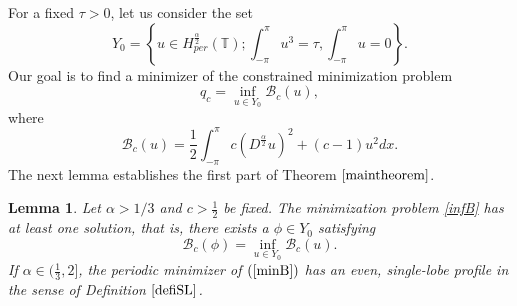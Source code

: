 \documentclass[12pt,reqno]{amsart}
\newcommand{\2}{L^2_{per}(0, T)}
\numberwithin{equation}{section}
\numberwithin{figure}{section}
\newtheorem{lemma}[theorem]{Lemma}
\begin{document}
For a fixed $\tau>0$, let us consider the set
\begin{equation}\displaystyle	Y_{0} = \left\{ u \in  H^{\frac{\alpha}{2}}_{per}(\mathbb{T}); \int_{-\pi}^{\pi}u^3 =\tau,  \int_{-\pi}^{\pi} u =0 \right\}.\label{Ycond} \end{equation}
Our goal is to find a minimizer of the constrained minimization problem
\begin{equation}\label{infB}
\displaystyle q_c= \inf_{u \in Y_{0}} \mathcal{B}_c(u),
\end{equation}
where
\begin{equation}\label{Bfunctional}
\displaystyle \mathcal{B}_c(u) = \frac{1}{2}\int_{-\pi}^{\pi}c(D^{\frac{\alpha}{2}}u)^2 + (c -1)u^2dx.
\end{equation}
\indent The next lemma establishes the first part of Theorem $\ref{maintheorem}$.
\begin{lemma}\label{minlema}
	Let $\alpha> 1/3$ and $c>\frac{1}{2}$ be fixed. The minimization problem \eqref{infB} has at least one solution, that is, there exists a $\phi \in Y_{0}$ satisfying
	\begin{equation}
	\displaystyle \mathcal{B}_c(\phi)= \inf_{u \in Y_{0}} \mathcal{B}_c(u).
	\end{equation}\label{minB}
	If $\alpha\in (\frac{1}{3},2]$, the periodic minimizer of $(\ref{minB})$ has an even, single-lobe profile in the sense of Definition $\ref{defiSL}$.
\end{lemma}
\end{document}
